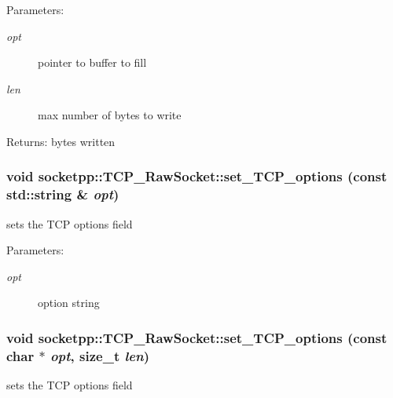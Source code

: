 \begin{Desc}
\item[Parameters:]
\begin{description}
\item[{\em opt}]pointer to buffer to fill \item[{\em len}]max number of bytes to write \end{description}
\end{Desc}
\begin{Desc}
\item[Returns:]bytes written \end{Desc}
\hypertarget{classsocketpp_1_1TCP__RawSocket_7bc9043e86c6f328cb99d98c4bfca05a}{
\subsubsection[{set\_\-TCP\_\-options}]{\setlength{\rightskip}{0pt plus 5cm}void socketpp::TCP\_\-RawSocket::set\_\-TCP\_\-options (const std::string \& {\em opt})}}
\label{classsocketpp_1_1TCP__RawSocket_7bc9043e86c6f328cb99d98c4bfca05a}


sets the TCP options field 

\begin{Desc}
\item[Parameters:]
\begin{description}
\item[{\em opt}]option string \end{description}
\end{Desc}
\hypertarget{classsocketpp_1_1TCP__RawSocket_c38e057fc6ece02026e71b7ee872533f}{
\subsubsection[{set\_\-TCP\_\-options}]{\setlength{\rightskip}{0pt plus 5cm}void socketpp::TCP\_\-RawSocket::set\_\-TCP\_\-options (const char $\ast$ {\em opt}, \/  size\_\-t {\em len})}}
\label{classsocketpp_1_1TCP__RawSocket_c38e057fc6ece02026e71b7ee872533f}


sets the TCP options field 

